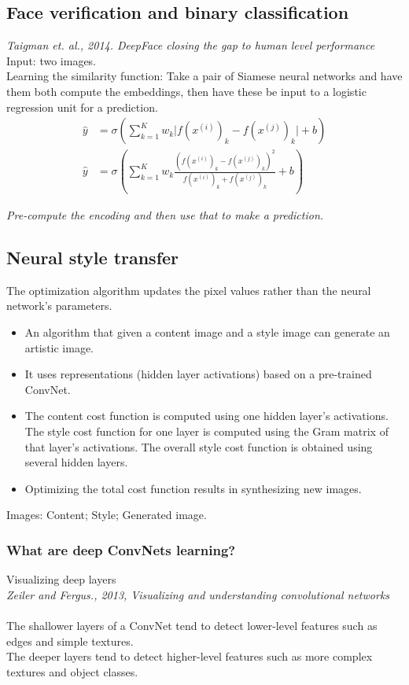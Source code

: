 %
\subsection{Face verification and binary classification}
\textit{Taigman et. al., 2014. DeepFace closing the gap to human level performance}\\
Input: two images.\\
Learning the similarity function: Take a pair of Siamese neural networks and have them both compute the embeddings, then have these be input to a logistic regression unit for a prediction.
\begin{align}
\hat{y} &= \sigma(\sum_{k=1}^K w_k \lvert f(x^{(i)})_k - f(x^{(j)})_k \rvert+ b)\\
\hat{y} &= \sigma(\sum_{k=1}^K w_k \frac{(f(x^{(i)})_k - f(x^{(j)})_k)^2}{f(x^{(i)})_k + f(x^{(j)})_k}+ b)
\end{align}

\emph{\textcolor{Bittersweet}{Pre-compute the encoding and then use that to make a prediction.}}

%
\subsection{Neural style transfer}
The optimization algorithm updates the pixel values rather than the neural network's parameters.

\begin{itemize}
\item
An algorithm that given a content image and a style image can generate an artistic image.
\item
It uses representations (hidden layer activations) based on a pre-trained ConvNet.
\item
The content cost function is computed using one hidden layer's activations.\\
The style cost function for one layer is computed using the Gram matrix of that layer's activations. The overall style cost function is obtained using several hidden layers.
\item
Optimizing the total cost function results in synthesizing new images.
\end{itemize}

Images: Content; Style; Generated image.

\subsubsection{What are deep ConvNets learning?}
Visualizing deep layers\\
\textit{Zeiler and Fergus., 2013, Visualizing and understanding convolutional networks}\\
\\
The shallower layers of a ConvNet tend to detect lower-level features such as edges and simple textures.\\
The deeper layers tend to detect higher-level features such as more complex textures and object classes.
